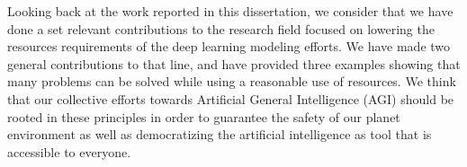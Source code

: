 Looking back at the work reported in this dissertation, we consider that we have done a set relevant contributions to the research field focused on lowering the resources requirements of the deep learning modeling efforts. We have made two general contributions to that line, and have provided three examples showing that many problems can be solved while using a reasonable use of resources. We think that our collective efforts towards Artificial General Intelligence (AGI) should be rooted in these principles in order to guarantee the safety of our planet environment as well as democratizing the artificial intelligence as tool that is accessible to everyone. 


